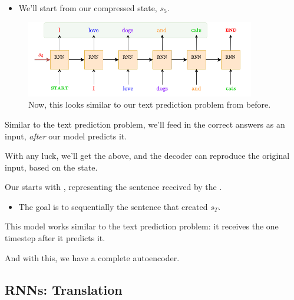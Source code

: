         \begin{itemize}
            \item We'll start from our compressed state, $s_5$.
        \end{itemize}

        \begin{figure}[H]
            \centering
            \includegraphics[width=100mm]{images/transformers_images/rnn_decoder.png}
            \caption*{Now, this looks similar to our text prediction problem from before.}
        \end{figure}

        Similar to the text prediction problem, we'll feed in the correct answers as an input, \textit{after} our model predicts it.

        With any luck, we'll get the above, and the decoder can reproduce the original input, based on the state.\\

        \begin{definition}
            Our  starts with , representing the sentence received by the .

            \begin{itemize}
                \item The goal is to sequentially  the sentence that created $s_T$.
            \end{itemize}

            This model works similar to the text prediction problem: it receives the  one timestep after it predicts it.
        \end{definition}

        And with this, we have a complete autoencoder.

    \phantom{}

    \subsection{RNNs: Translation}


